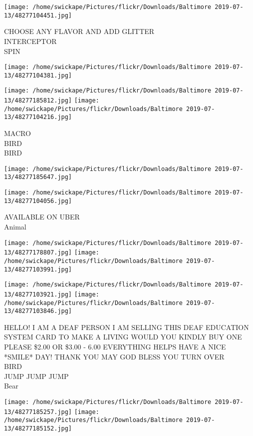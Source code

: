 \documentclass[10pt,letterpaper]{article}
\begin{document}
\texttt{[image: /home/swickape/Pictures/flickr/Downloads/Baltimore 2019-07-13/48277104451.jpg]}

CHOOSE ANY FLAVOR AND ADD GLITTER\\
INTERCEPTOR\\
SPIN
\pagebreak

\texttt{[image: /home/swickape/Pictures/flickr/Downloads/Baltimore 2019-07-13/48277104381.jpg]}

\vspace{0.25in}
\texttt{[image: /home/swickape/Pictures/flickr/Downloads/Baltimore 2019-07-13/48277185812.jpg]}
\texttt{[image: /home/swickape/Pictures/flickr/Downloads/Baltimore 2019-07-13/48277104216.jpg]}

MACRO\\
BIRD\\
BIRD
\pagebreak

\texttt{[image: /home/swickape/Pictures/flickr/Downloads/Baltimore 2019-07-13/48277185647.jpg]}

\vspace{0.25in}
\texttt{[image: /home/swickape/Pictures/flickr/Downloads/Baltimore 2019-07-13/48277104056.jpg]}

AVAILABLE ON UBER\\
Animal
\pagebreak

\texttt{[image: /home/swickape/Pictures/flickr/Downloads/Baltimore 2019-07-13/48277178807.jpg]}
\texttt{[image: /home/swickape/Pictures/flickr/Downloads/Baltimore 2019-07-13/48277103991.jpg]}

\texttt{[image: /home/swickape/Pictures/flickr/Downloads/Baltimore 2019-07-13/48277103921.jpg]}
\texttt{[image: /home/swickape/Pictures/flickr/Downloads/Baltimore 2019-07-13/48277103846.jpg]}

HELLO!  I AM A DEAF PERSON I AM SELLING THIS DEAF EDUCATION SYSTEM CARD TO MAKE A LIVING WOULD YOU KINDLY BUY ONE PLEASE \$2.00 OR \$3.00 {-} 6.00 EVERYTHING HELPS HAVE A NICE *SMILE* DAY!  THANK YOU MAY GOD BLESS YOU TURN OVER\\
BIRD\\
JUMP JUMP JUMP\\
Bear
\pagebreak

\texttt{[image: /home/swickape/Pictures/flickr/Downloads/Baltimore 2019-07-13/48277185257.jpg]}
\texttt{[image: /home/swickape/Pictures/flickr/Downloads/Baltimore 2019-07-13/48277185152.jpg]}
\end{document}
